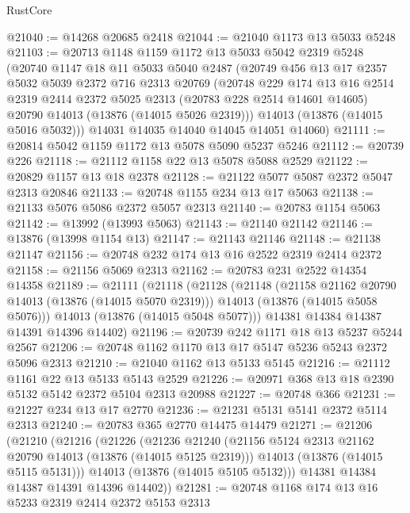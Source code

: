 \begin{lexlean}{RustCore}
\begin{coremodule}
@21040 := @14268 @20685 @2418
@21044 := @21040 @1173 @13 @5033 @5248
@21103 := @20713
    @1148
    @1159
    @1172
    @13
    @5033
    @5042
    @2319
    @5248
    (@20740
      @1147
      @18
      @11
      @5033
      @5040
      @2487
      (@20749
        @456
        @13
        @17
        @2357
        @5032
        @5039
        @2372
        @716
        @2313
        @20769
        (@20748
          @229
          @174
          @13
          @16
          @2514
          @2319
          @2414
          @2372
          @5025
          @2313
          (@20783 @228 @2514 @14601 @14605)
          @20790
          @14013
          (@13876 (@14015 @5026 @2319)))
        @14013
        (@13876 (@14015 @5016 @5032)))
      @14031
      @14035
      @14040
      @14045
      @14051
      @14060)
@21111 := @20814 @5042 @1159 @1172 @13 @5078 @5090 @5237 @5246
@21112 := @20739 @226
@21118 := @21112 @1158 @22 @13 @5078 @5088 @2529
@21122 := @20829 @1157 @13 @18 @2378
@21128 := @21122 @5077 @5087 @2372 @5047 @2313 @20846
@21133 := @20748 @1155 @234 @13 @17 @5063
@21138 := @21133 @5076 @5086 @2372 @5057 @2313
@21140 := @20783 @1154 @5063
@21142 := @13992 (@13993 @5063)
@21143 := @21140 @21142
@21146 := @13876 (@13998 @1154 @13)
@21147 := @21143 @21146
@21148 := @21138 @21147
@21156 := @20748 @232 @174 @13 @16 @2522 @2319 @2414 @2372
@21158 := @21156 @5069 @2313
@21162 := @20783 @231 @2522 @14354 @14358
@21189 := @21111
    (@21118
      (@21128
        (@21148
          (@21158 @21162 @20790 @14013 (@13876 (@14015 @5070 @2319)))
          @14013
          (@13876 (@14015 @5058 @5076)))
        @14013
        (@13876 (@14015 @5048 @5077)))
      @14381
      @14384
      @14387
      @14391
      @14396
      @14402)
@21196 := @20739 @242 @1171 @18 @13 @5237 @5244 @2567
@21206 := @20748 @1162 @1170 @13 @17 @5147 @5236 @5243 @2372 @5096 @2313
@21210 := @21040 @1162 @13 @5133 @5145
@21216 := @21112 @1161 @22 @13 @5133 @5143 @2529
@21226 := @20971 @368 @13 @18 @2390 @5132 @5142 @2372 @5104 @2313 @20988
@21227 := @20748 @366
@21231 := @21227 @234 @13 @17 @2770
@21236 := @21231 @5131 @5141 @2372 @5114 @2313
@21240 := @20783 @365 @2770 @14475 @14479
@21271 := @21206
    (@21210
      (@21216
        (@21226
          (@21236
            @21240
            (@21156 @5124 @2313 @21162 @20790 @14013 (@13876 (@14015 @5125 @2319)))
            @14013
            (@13876 (@14015 @5115 @5131)))
          @14013
          (@13876 (@14015 @5105 @5132)))
        @14381
        @14384
        @14387
        @14391
        @14396
        @14402))
@21281 := @20748 @1168 @174 @13 @16 @5233 @2319 @2414 @2372 @5153 @2313

\end{coremodule}
\end{lexlean}
